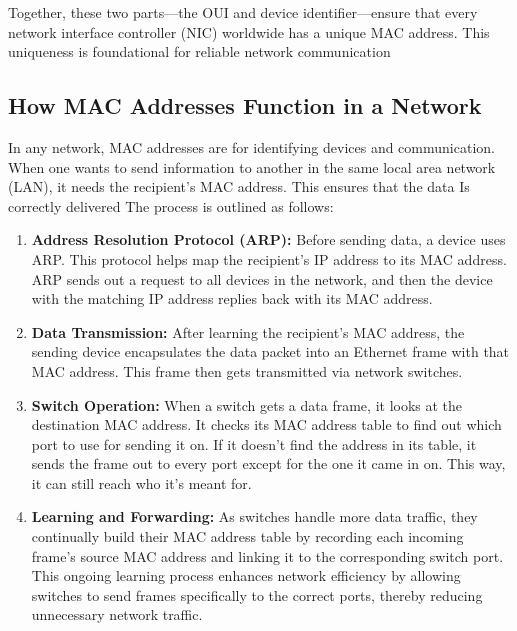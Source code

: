 \documentclass[11pt,a4paper]{article}
\begin{document}
Together, these two parts—the OUI and device identifier—ensure that every network interface controller (NIC) worldwide has a unique MAC address. This uniqueness is foundational for reliable network communication~\cite{IEEE-Standards-Association}

\subsection*{How MAC Addresses Function in a Network}

In any network, MAC addresses are for identifying devices and communication. When one wants to send information to another in the same local area network (LAN), it needs the recipient's MAC address. This ensures that the data Is correctly delivered The process is outlined as follows:

\begin{enumerate}
    
    \item \textbf{Address Resolution Protocol (ARP):} Before sending data, a device uses ARP. This protocol helps map the recipient's IP address to its MAC address. ARP sends out a request to all devices in the network, and then the device with the matching IP address replies back with its MAC address.

    \item \textbf{Data Transmission:} After learning the recipient’s MAC address, the sending device encapsulates the data packet into an Ethernet frame with that MAC address. This frame then gets transmitted via network switches.

    \item \textbf{Switch Operation:} When a switch gets a data frame, it looks at the destination MAC address. It checks its MAC address table to find out which port to use for sending it on. If it doesn't find the address in its table, it sends the frame out to every port except for the one it came in on. This way, it can still reach who it's meant for.


    \item \textbf{Learning and Forwarding:} As switches handle more data traffic, they continually build their MAC address table by recording each incoming frame’s source MAC address and linking it to the corresponding switch port. This ongoing learning process enhances network efficiency by allowing switches to send frames specifically to the correct ports, thereby reducing unnecessary network traffic.

\end{enumerate}
\end{document}
